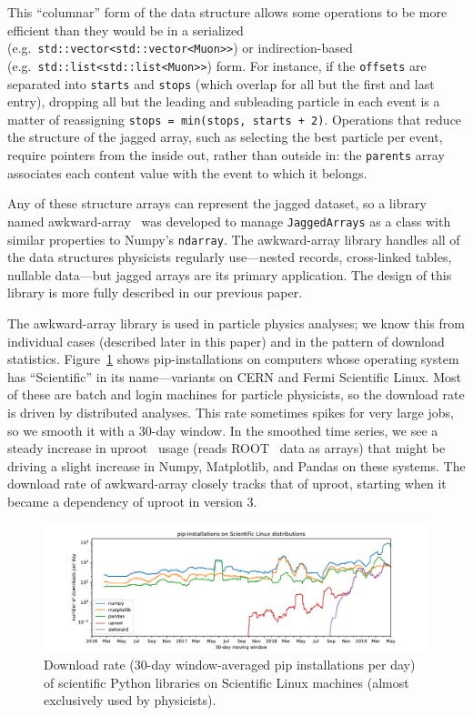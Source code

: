 \documentclass[a4paper]{jpconf}
\begin{document}
This ``columnar'' form of the data structure allows some operations to be more efficient than they would be in a serialized (e.g.\ {\tt std::vector<std::vector<Muon>>}) or indirection-based (e.g.\ {\tt std::list<std::list<Muon>>}) form. For instance, if the {\tt offsets} are separated into {\tt starts} and {\tt stops} (which overlap for all but the first and last entry), dropping all but the leading and subleading particle in each event is a matter of reassigning {\tt stops = min(stops, starts + 2)}. Operations that reduce the structure of the jagged array, such as selecting the best particle per event, require pointers from the inside out, rather than outside in: the {\tt parents} array associates each content value with the event to which it belongs.

Any of these structure arrays can represent the jagged dataset, so a library named awkward-array~\cite{awkward} was developed to manage {\tt JaggedArrays} as a class with similar properties to Numpy's {\tt ndarray}. The awkward-array library handles all of the data structures physicists regularly use---nested records, cross-linked tables, nullable data---but jagged arrays are its primary application. The design of this library is more fully described in our previous paper\cite{2019EPJWC}.

The awkward-array library is used in particle physics analyses; we know this from individual cases (described later in this paper) and in the pattern of download statistics. Figure~\ref{fig:uproot} shows pip-installations on computers whose operating system has ``Scientific'' in its name---variants on CERN and Fermi Scientific Linux. Most of these are batch and login machines for particle physicists, so the download rate is driven by distributed analyses. This rate sometimes spikes for very large jobs, so we smooth it with a 30-day window. In the smoothed time series, we see a steady increase in uproot~\cite{uproot} usage (reads ROOT~\cite{root} data as arrays) that might be driving a slight increase in Numpy, Matplotlib, and Pandas on these systems. The download rate of awkward-array closely tracks that of uproot, starting when it became a dependency of uproot in version 3.

\begin{figure}
\includegraphics[width=\linewidth]{pip-scientificlinux-uproot.pdf}

\caption{Download rate (30-day window-averaged pip installations per day) of scientific Python libraries on Scientific Linux machines (almost exclusively used by physicists). \label{fig:uproot}}
\end{figure}
\end{document}
